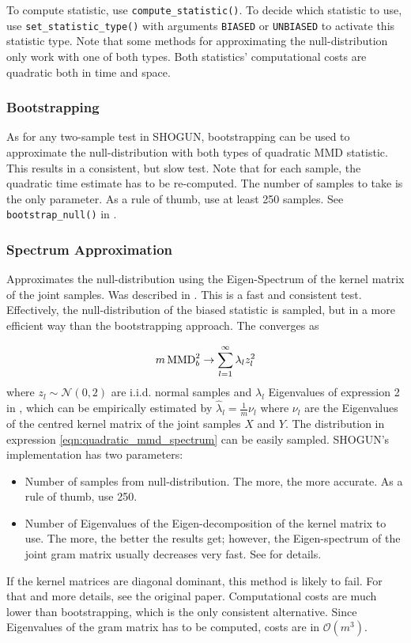 To compute statistic, use \texttt{compute\_statistic()}. To decide which statistic to use, use \texttt{set\_statistic\_type()} with arguments \texttt{BIASED} or \texttt{UNBIASED} to activate this statistic type. Note that some methods for approximating the null-distribution only work with one of both types. Both statistics' computational costs are quadratic both in time and space.

\subsubsection{Bootstrapping}
As for any two-sample test in SHOGUN, bootstrapping can be used to approximate the null-distribution with both types of quadratic MMD statistic. This results in a consistent, but slow test. Note that for each sample, the quadratic time estimate has to be re-computed. The number of samples to take is the only parameter. As a rule of thumb, use at least 250 samples.
See \texttt{bootstrap\_null()} in .

\subsubsection{Spectrum Approximation}
Approximates the null-distribution using the Eigen-Spectrum of the kernel matrix of the joint samples. Was described in \citep{Gretton2012b}. This is a fast and consistent test. Effectively, the null-distribution of the biased statistic is sampled, but in a more efficient way than the bootstrapping approach. The converges as

\begin{align}
\label{eqn:quadratic_mmd_spectrum}
m\operatorname{MMD}^2_b \rightarrow \sum_{l=1}^\infty \lambda_l z_l^2
\end{align}
where $z_l\sim \mathcal{N}(0,2)$ are i.i.d. normal samples and $\lambda_l$ Eigenvalues of expression 2 in \citep{Gretton2012b}, which can be empirically estimated by $\hat\lambda_l=\frac{1}{m}\nu_l$ where $\nu_l$ are the Eigenvalues of the centred kernel matrix of the joint samples $X$ and $Y$. The distribution in expression \ref{eqn:quadratic_mmd_spectrum} can be easily sampled. SHOGUN's implementation has two parameters:
\begin{itemize}
\item Number of samples from null-distribution. The more, the more accurate. As a rule of thumb, use 250.
\item Number of Eigenvalues of the Eigen-decomposition of the kernel matrix to use. The more, the better the results get; however, the Eigen-spectrum of the joint gram matrix usually decreases very fast. See \citep{Gretton2012b} for details.
\end{itemize}
If the kernel matrices are diagonal dominant, this method is likely to fail. For that and more details, see the original paper. Computational costs are much lower than bootstrapping, which is the only consistent alternative. Since Eigenvalues of the gram matrix has to be computed, costs are in $\mathcal{O}(m^3)$.

